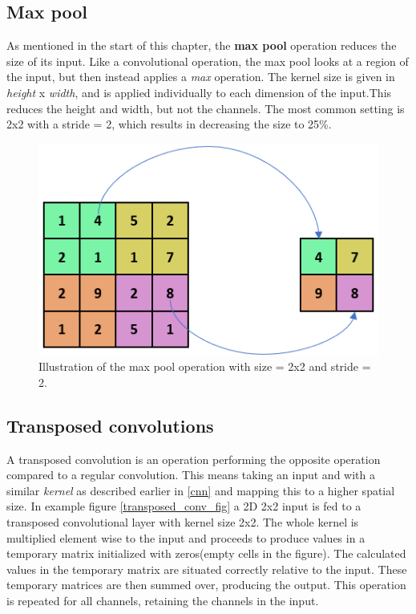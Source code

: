     
    
\subsection{Max pool}
    As mentioned in the start of this chapter, the \textbf{max pool} operation reduces the size of its input\cite{o2015introduction_convolutions}. Like a convolutional operation, the max pool looks at a region of the input, but then instead applies a \textit{max} operation. The kernel size is given in \textit{height} x \textit{width}, and is applied individually to each dimension of the input.This reduces the height and width, but not the channels. The most common setting is 2x2 with a stride = 2, which results in decreasing the size to 25\%.

    \begin{figure}[H]
        \centering
        \includegraphics[scale=0.5]{figures/max_pool.png}
        \caption[The max pool operation]{Illustration of the max pool operation with size = 2x2 and stride = 2.}
      	\medskip 
        \label{maxpool_fig}
    \end{figure}
    
\subsection{Transposed convolutions}
    A transposed convolution is an operation performing the opposite operation compared to a regular convolution. This means taking an input and with a similar \textit{kernel} as described earlier in \ref{cnn} and mapping this to a higher spatial size. In example figure \ref{transposed_conv_fig} a 2D 2x2 input is fed to a transposed convolutional layer with kernel size 2x2. The whole kernel is multiplied element wise to the input and proceeds to produce values in a temporary matrix initialized with zeros(empty cells in the figure). The calculated values in the temporary matrix are situated correctly relative to the input. These temporary matrices are then summed over, producing the output. This operation is repeated for all channels, retaining the channels in the input.
    
